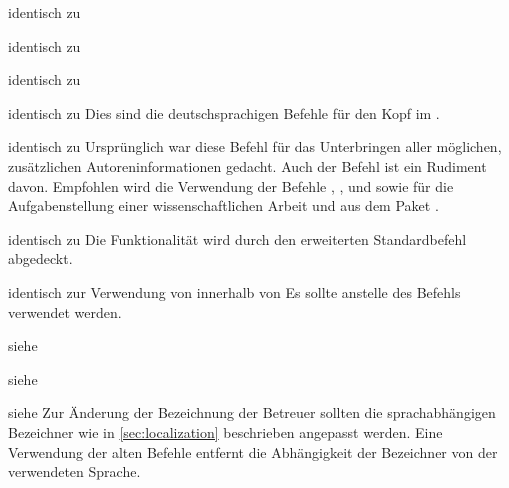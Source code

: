 \documentclass[%
  english,ngerman,%
  headings=optiontoheadandtoc,captions=tableheading,numbers=noenddot,%
  chapterpage,cdfoot,%
]{tudscrman}
\begin{document}
\begin{Declaration}{}{%
  identisch zu 
}
\begin{Declaration}{}{%
  identisch zu 
}
\begin{Declaration}{}{%
  identisch zu 
}
\begin{Declaration}{}{%
  identisch zu 
}
\printdeclarationlist%
Dies sind die deutschsprachigen Befehle für den Kopf im \CD.
\end{Declaration}
\end{Declaration}
\end{Declaration}
\end{Declaration}

\begin{Declaration}{}{%
  identisch zu %
}
\printdeclarationlist%
Ursprünglich war diese Befehl für das Unterbringen aller möglichen, zusätzlichen 
Autoreninformationen gedacht. Auch der Befehl  ist ein 
Rudiment davon. Empfohlen wird die Verwendung der Befehle , 
,  und  
sowie für die Aufgabenstellung einer wissenschaftlichen Arbeit  
und  aus dem Paket .
\end{Declaration}

\begin{Declaration}{}{%
  identisch zu %
}
\printdeclarationlist%
Die Funktionalität wird durch den erweiterten Standardbefehl  
abgedeckt.
\end{Declaration}

\begin{Declaration}{}{%
  identisch zur Verwendung von  innerhalb von %
}
\printdeclarationlist%
Es sollte 
anstelle des Befehls  verwendet werden.
\end{Declaration}

\begin{Declaration}{}{%
  siehe %
}
\begin{Declaration}{}{%
  siehe %
}
\begin{Declaration}{}{%
  siehe %
}
\printdeclarationlist%
Zur Änderung der Bezeichnung der Betreuer sollten die sprachabhängigen 
Bezeichner wie in \autoref{sec:localization} beschrieben angepasst werden. Eine 
Verwendung der alten Befehle entfernt die Abhängigkeit der Bezeichner von der 
verwendeten Sprache.
\end{Declaration}
\end{Declaration}
\end{Declaration}
\end{document}
